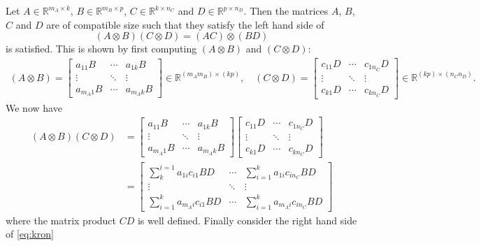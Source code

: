 Let $A\in \mathbb{R}^{m_{A}\times k}$, $B\in \mathbb{R}^{m_B\times p}$, $C\in \mathbb{R}^{k\times n_{C}}$ and $D\in \mathbb{R}^{p\times n_{D}}$. Then the matrices $A$, $B$, $C$ and $D$ are of  compatible size such that they satisfy the left hand side of
\begin{equation}
  \label{eq:kron}
  (A\otimes B)(C\otimes D) = (AC)\otimes (BD)
\end{equation}
is satisfied. This is shown by first computing $  (A\otimes B)$ and $  (C\otimes D)$:
\begin{align*}
  (A\otimes B) = \begin{bmatrix}
a_{11}B & \cdots & a_{1k}B\\
\vdots & \ddots & \vdots\\
a_{m_{A}1}B & \cdots & a_{m_{A}k}B
\end{bmatrix}
\in \mathbb{R}^{(m_{A}m_{B})\times (kp)},\quad (C\otimes D) = \begin{bmatrix}
c_{11}D & \cdots & c_{1n_{C}}D\\
\vdots & \ddots & \vdots\\
c_{k1}D & \cdots & c_{kn_{C}}D
\end{bmatrix}
\in \mathbb{R}^{(kp)\times (n_{C}n_{D})}.
\end{align*}
We now have
\begin{align*}
  (A\otimes B)(C\otimes D) &= \begin{bmatrix}
a_{11}B & \cdots & a_{1k}B\\
\vdots & \ddots & \vdots\\
a_{m_{A}1}B & \cdots & a_{m_{A}k}B
\end{bmatrix}
\begin{bmatrix}
c_{11}D & \cdots & c_{1n_{C}}D\\
\vdots & \ddots & \vdots\\
c_{k1}D & \cdots & c_{kn_{C}}D
\end{bmatrix}\\
 &= \begin{bmatrix}
\sum\limits_{k}^{i = 1}a_{1i}c_{i1}BD & \cdots & \sum\limits^{k}_{i = 1}a_{1i}c_{in_{C}}BD\\
\vdots & \ddots & \vdots\\
\sum\limits^{k}_{i = 1}a_{m_{A}i}c_{i1}BD & \cdots & \sum\limits^{k}_{i = 1}a_{m_{A}i}c_{in_{C}}BD
\end{bmatrix}
\end{align*}
where the matrix product $CD$ is well defined. Finally consider the right hand side of \eqref{eq:kron}

